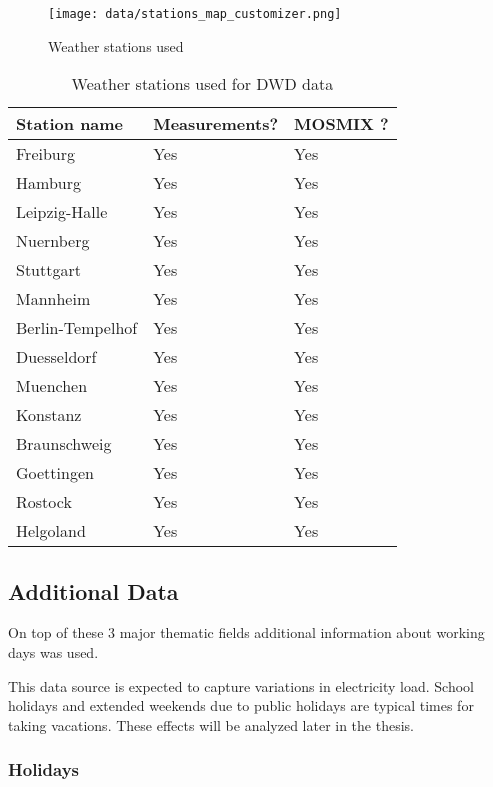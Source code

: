 \documentclass[class=scrbook, crop=false]{standalone}
\begin{document}
\begin{figure}[ht]
            \centering
            \texttt{[image: data/stations\_map\_customizer.png]}
            \caption[Weather stations used]{Weather stations used}
            \label{fig::weather_stations}
 \end{figure}
 

\begin{table}[]
\centering
\begin{tabular}{l|l|l}
Station name & Measurements? & MOSMIX ?\\\hline
   Freiburg&Yes&Yes\\
   Hamburg&Yes&Yes\\
    Leipzig-Halle&Yes&Yes\\
    Nuernberg&Yes&Yes\\
    Stuttgart&Yes&Yes\\
    Mannheim&Yes&Yes\\
    Berlin-Tempelhof&Yes&Yes\\
    Duesseldorf&Yes&Yes\\
    Muenchen&Yes&Yes\\
   Konstanz&Yes&Yes\\
   Braunschweig&Yes&Yes\\
   Goettingen&Yes&Yes\\
   Rostock&Yes&Yes\\
   Helgoland&Yes&Yes   
\end{tabular}
\caption{Weather stations used for DWD data}
\label{Table::Weather_Stations}
\end{table}



 
 

\subsection{Additional Data}
\label{Section::Additional_Data}
On top of these 3 major thematic fields additional information about working days was used. 

This data source is expected to capture variations in electricity load.
School holidays and extended weekends due to public holidays are typical times for taking vacations.
These effects will be analyzed later in the thesis.

\subsubsection{Holidays}
\end{document}
